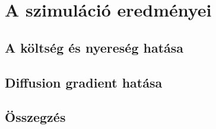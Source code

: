 \section{A szimuláció eredményei}
\subsection{A költség és nyereség hatása}
\subsection{Diffusion gradient hatása}
\subsection{Összegzés}
